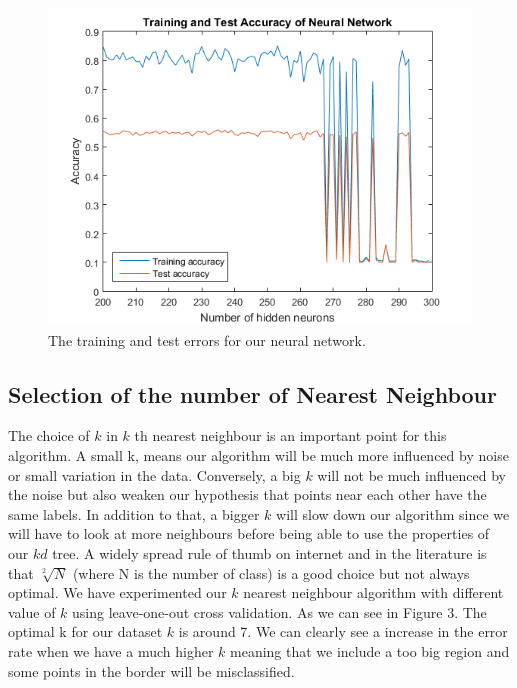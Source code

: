 \documentclass{article} %
\begin{document}
\begin{figure}
\centering
\includegraphics{fig1.png}
\caption{The training and test errors for our neural network.}
\end{figure}

\subsection{Selection of the number of Nearest Neighbour}

The choice of $k$ in $k$ th nearest neighbour is an important point for this algorithm. A small k, means our algorithm will be much more influenced by noise or small variation in the data. Conversely, a big $k$ will not be much influenced by the noise but also weaken our hypothesis that points near each other have the same labels. In addition to that, a bigger $k$ will slow down our algorithm since we will have to look at more neighbours before being able to use the properties of our $kd$ tree. A widely spread rule of thumb on internet and in the literature is that  $\sqrt[2]{N}$ (where N is the number of class) is a good choice but not always optimal. 
We have experimented our $k$ nearest neighbour algorithm with different value of $k$ using leave-one-out cross validation. As we can see in Figure 3. The optimal k for our dataset $k$ is around 7. 
We can clearly see a increase in the error rate when we have a much higher $k$ meaning that we include a too big region and some points in the border will be misclassified. 
\end{document}
